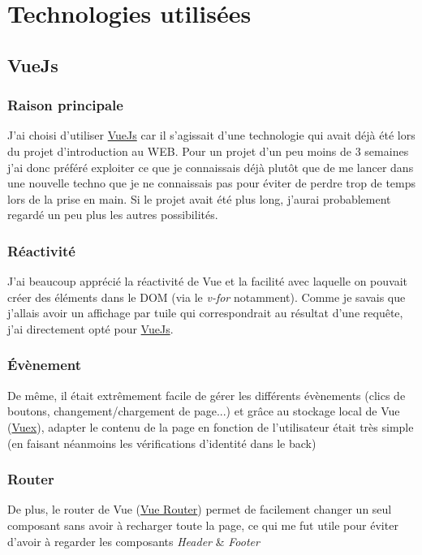 \documentclass[english,12pt,a4paper]{report}
\newcommand{\ul}[1]{%
	\uline{\phantom{#1}}%
	\llap{\contour{white}{#1}}%
}
\begin{document}

\tableofcontents
\pagebreak

\part{Technologies utilisées}
\chapter{VueJs}
\section{Raison principale}
J'ai choisi d'utiliser \href{https://vuejs.org/}{VueJs} car il s'agissait d'une technologie qui avait déjà été \ul{vue} lors du projet d'introduction au WEB. Pour un projet d'un peu moins de 3 semaines j'ai donc préféré exploiter ce que je connaissais déjà plutôt que de me lancer dans une nouvelle techno que je ne connaissais pas pour éviter de perdre trop de temps lors de la prise en main. Si le projet avait été plus long, j'aurai probablement regardé un peu plus les autres possibilités.

\section{Réactivité}
J'ai beaucoup apprécié la réactivité de Vue et la facilité avec laquelle on pouvait créer des éléments dans le DOM (via le \textit{v-for} notamment). Comme je savais que j'allais avoir un affichage par tuile qui correspondrait au résultat d'une requête, j'ai directement opté pour \href{https://vuejs.org/}{VueJs}.

\section{Évènement}
De même, il était extrêmement facile de gérer les différents évènements (clics de boutons, changement/chargement de page...) et grâce au stockage local de Vue (\href{https://vuex.vuejs.org/}{Vuex}), adapter le contenu de la page en fonction de l'utilisateur était très simple (en faisant néanmoins les vérifications d'identité dans le back)

\section{Router}
De plus, le router de Vue (\href{https://router.vuejs.org/}{Vue Router}) permet de facilement changer un seul composant sans avoir à recharger toute la page, ce qui me fut utile pour éviter d'avoir à regarder les composants \textit{Header} \& \textit{Footer}
\end{document}
